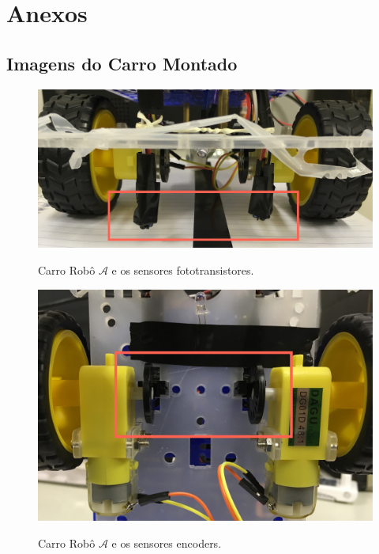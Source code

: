 \section{Anexos} \label{sec:anexo}
	\subsection{Imagens do Carro Montado}

		\begin{figure}[h]
			\centering
			\includegraphics[width=1\linewidth]{img/robot_fotos.jpg}
			\label{fig:robot_foto}
			\caption{Carro Robô $ \mathcal{A} $ e os sensores fototransistores.}
		\end{figure}

		\begin{figure}[h]
			\centering
			\includegraphics[width=1\linewidth]{img/robot_encoders.jpg}
			\label{fig:robot_encoder}
			\caption{Carro Robô $ \mathcal{A} $ e os sensores encoders.}
		\end{figure}
        
